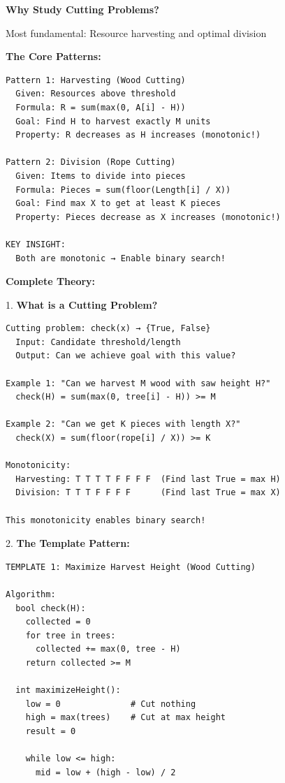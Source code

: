 \documentclass[11pt,a4paper,oneside]{book}
\begin{document}
\begin{tcolorbox}[
    enhanced,breakable,
    colback=white,
    colframe=deepblue,
    boxrule=1.5pt,
    arc=3mm,
    title=\textbf{The Harvesting and Division Paradigm}
]
\textbf{Why Study Cutting Problems?}

Most fundamental: Resource harvesting and optimal division

\textbf{The Core Patterns:}
\begin{verbatim}
Pattern 1: Harvesting (Wood Cutting)
  Given: Resources above threshold
  Formula: R = sum(max(0, A[i] - H))
  Goal: Find H to harvest exactly M units
  Property: R decreases as H increases (monotonic!)

Pattern 2: Division (Rope Cutting)
  Given: Items to divide into pieces
  Formula: Pieces = sum(floor(Length[i] / X))
  Goal: Find max X to get at least K pieces
  Property: Pieces decrease as X increases (monotonic!)

KEY INSIGHT:
  Both are monotonic → Enable binary search!
\end{verbatim}

\textbf{Complete Theory:}

1. \textbf{What is a Cutting Problem?}
\begin{verbatim}
Cutting problem: check(x) → {True, False}
  Input: Candidate threshold/length
  Output: Can we achieve goal with this value?

Example 1: "Can we harvest M wood with saw height H?"
  check(H) = sum(max(0, tree[i] - H)) >= M

Example 2: "Can we get K pieces with length X?"
  check(X) = sum(floor(rope[i] / X)) >= K

Monotonicity:
  Harvesting: T T T T F F F F  (Find last True = max H)
  Division: T T T F F F F      (Find last True = max X)

This monotonicity enables binary search!
\end{verbatim}

2. \textbf{The Template Pattern:}
\begin{verbatim}
TEMPLATE 1: Maximize Harvest Height (Wood Cutting)

Algorithm:
  bool check(H):
    collected = 0
    for tree in trees:
      collected += max(0, tree - H)
    return collected >= M
  
  int maximizeHeight():
    low = 0              # Cut nothing
    high = max(trees)    # Cut at max height
    result = 0
    
    while low <= high:
      mid = low + (high - low) / 2
      

\end{verbatim}
\end{tcolorbox}
\end{document}
